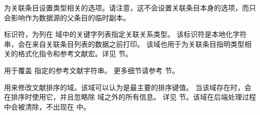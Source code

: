 \begin{fieldlist}
为关联条目设置类型相关的选项。请注意，这不会设置关联条目本身的选项，而只会影响作为数据源的父条目的临时副本。



标识符，为列在  域中的关键字列表指定关联关系类型。
该标识符是本地化字符串，会在来自关联条目列表的数据之前打印。
该域也用于为关联条目指明类型相关的格式化指令和参考文献宏。详见  节。




用于覆盖  指定的参考文献字符串。
更多细节请参考  节。




用来修改文献排序的域。该域可以认为是最主要的排序键值。
当该域存在时，\biblatex 会在排序时使用它，并且忽略除  域之外的所有信息。
详见  节。该域在后端处理过程中会被清除，不出现在  中。




\end{fieldlist}
